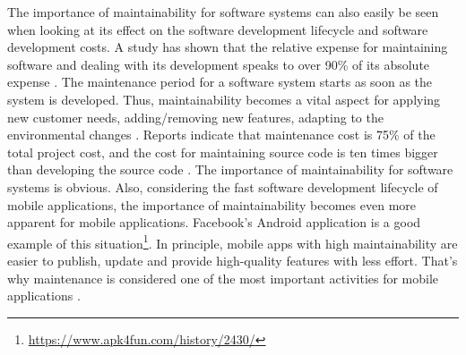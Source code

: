 The importance of maintainability for software systems can also easily be seen when looking at its effect on the software development lifecycle and software development costs. A study has shown that the relative expense for maintaining software and dealing with its development speaks to over 90\% of its absolute expense \cite{4}. The maintenance period for a software system starts as soon as the system is developed. Thus, maintainability becomes a vital aspect for applying new customer needs, adding/removing new features, adapting to the environmental changes \cite{23}. Reports indicate that maintenance cost is 75\% of the total project cost, and the cost for maintaining source code is ten times bigger than developing the source code \cite{22}. The importance of maintainability for software systems is obvious. Also, considering the fast software development lifecycle of mobile applications, the importance of maintainability becomes even more apparent for mobile applications. Facebook's Android application is a good example of this situation\footnote{\url{https://www.apk4fun.com/history/2430/}}. In principle, mobile apps with high maintainability are easier to publish, update and provide high-quality features with less effort. That's why maintenance is considered one of the most important activities for mobile applications \cite{53}.

